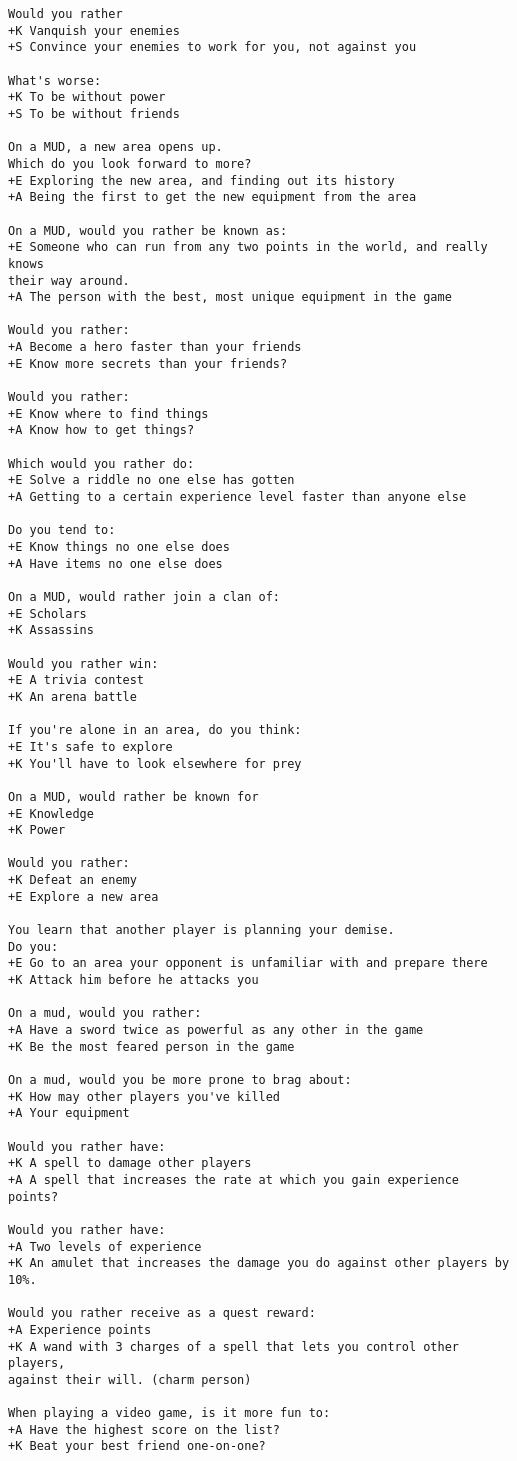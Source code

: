 \begin{verbatim}
Would you rather
+K Vanquish your enemies
+S Convince your enemies to work for you, not against you

What's worse:
+K To be without power
+S To be without friends

On a MUD, a new area opens up.
Which do you look forward to more?
+E Exploring the new area, and finding out its history
+A Being the first to get the new equipment from the area

On a MUD, would you rather be known as:
+E Someone who can run from any two points in the world, and really knows
their way around.
+A The person with the best, most unique equipment in the game

Would you rather:
+A Become a hero faster than your friends
+E Know more secrets than your friends?

Would you rather:
+E Know where to find things
+A Know how to get things?

Which would you rather do:
+E Solve a riddle no one else has gotten
+A Getting to a certain experience level faster than anyone else

Do you tend to:
+E Know things no one else does
+A Have items no one else does

On a MUD, would rather join a clan of:
+E Scholars
+K Assassins

Would you rather win:
+E A trivia contest
+K An arena battle

If you're alone in an area, do you think:
+E It's safe to explore
+K You'll have to look elsewhere for prey

On a MUD, would rather be known for
+E Knowledge
+K Power

Would you rather:
+K Defeat an enemy
+E Explore a new area

You learn that another player is planning your demise.
Do you:
+E Go to an area your opponent is unfamiliar with and prepare there
+K Attack him before he attacks you

On a mud, would you rather:
+A Have a sword twice as powerful as any other in the game
+K Be the most feared person in the game

On a mud, would you be more prone to brag about:
+K How may other players you've killed
+A Your equipment

Would you rather have:
+K A spell to damage other players
+A A spell that increases the rate at which you gain experience points?

Would you rather have:
+A Two levels of experience
+K An amulet that increases the damage you do against other players by 10%.

Would you rather receive as a quest reward:
+A Experience points
+K A wand with 3 charges of a spell that lets you control other players,
against their will. (charm person)

When playing a video game, is it more fun to:
+A Have the highest score on the list?
+K Beat your best friend one-on-one?
\end{verbatim}